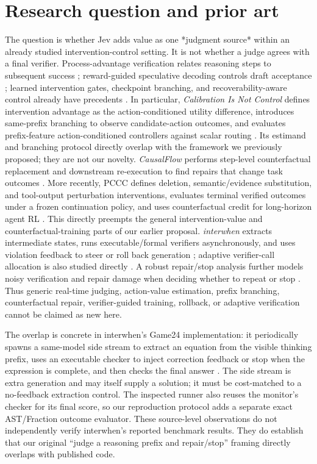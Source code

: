 \documentclass[11pt]{article}
\begin{document}
\section{Research question and prior art}
The question is whether Jev adds value as one *judgment source* within an already studied intervention-control setting. It is not whether a judge agrees with a final verifier. Process-advantage verification relates reasoning steps to subsequent success \cite{pav}; reward-guided speculative decoding controls draft acceptance \cite{rsd}; learned intervention gates, checkpoint branching, and recoverability-aware control already have precedents \cite{calibration,dial,guard}. In particular, \emph{Calibration Is Not Control} defines intervention advantage as the action-conditioned utility difference, introduces same-prefix branching to observe candidate-action outcomes, and evaluates prefix-feature action-conditioned controllers against scalar routing \cite{calibration}. Its estimand and branching protocol directly overlap with the framework we previously proposed; they are not our novelty. \emph{CausalFlow} performs step-level counterfactual replacement and downstream re-execution to find repairs that change task outcomes \cite{causalflow}. More recently, PCCC defines deletion, semantic/evidence substitution, and tool-output perturbation interventions, evaluates terminal verified outcomes under a frozen continuation policy, and uses counterfactual credit for long-horizon agent RL \cite{cvtrl}. This directly preempts the general intervention-value and counterfactual-training parts of our earlier proposal. \emph{interwhen} extracts intermediate states, runs executable/formal verifiers asynchronously, and uses violation feedback to steer or roll back generation \cite{interwhen}; adaptive verifier-call allocation is also studied directly \cite{adaptivecompute}. A robust repair/stop analysis further models noisy verification and repair damage when deciding whether to repeat or stop \cite{vrrstop}. Thus generic real-time judging, action-value estimation, prefix branching, counterfactual repair, verifier-guided training, rollback, or adaptive verification cannot be claimed as new here.

The overlap is concrete in interwhen's Game24 implementation: it periodically spawns a same-model side stream to extract an equation from the visible thinking prefix, uses an executable checker to inject correction feedback or stop when the expression is complete, and then checks the final answer \cite{interwhenCode}. The side stream is extra generation and may itself supply a solution; it must be cost-matched to a no-feedback extraction control. The inspected runner also reuses the monitor's checker for its final score, so our reproduction protocol adds a separate exact AST/Fraction outcome evaluator. These source-level observations do not independently verify interwhen's reported benchmark results. They do establish that our original “judge a reasoning prefix and repair/stop” framing directly overlaps with published code.
\end{document}
